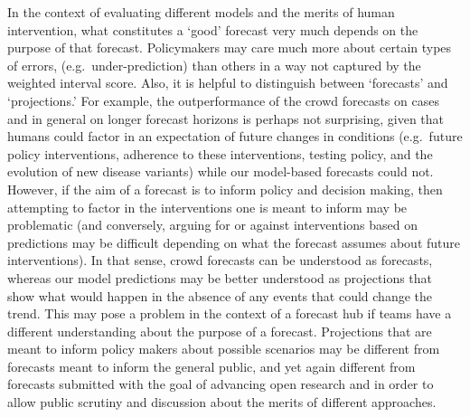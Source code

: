 \documentclass[
]{article}
\begin{document}
In the context of evaluating different models and the merits of human intervention, what constitutes a `good' forecast very much depends on the purpose of that forecast. Policymakers may care much more about certain types of errors, (e.g.~under-prediction) than others in a way not captured by the weighted interval score. Also, it is helpful to distinguish between `forecasts' and `projections.' For example, the outperformance of the crowd forecasts on cases and in general on longer forecast horizons is perhaps not surprising, given that humans could factor in an expectation of future changes in conditions (e.g.~future policy interventions, adherence to these interventions, testing policy, and the evolution of new disease variants) while our model-based forecasts could not. However, if the aim of a forecast is to inform policy and decision making, then attempting to factor in the interventions one is meant to inform may be problematic (and conversely, arguing for or against interventions based on predictions may be difficult depending on what the forecast assumes about future interventions). In that sense, crowd forecasts can be understood as forecasts, whereas our model predictions may be better understood as projections that show what would happen in the absence of any events that could change the trend. This may pose a problem in the context of a forecast hub if teams have a different understanding about the purpose of a forecast. Projections that are meant to inform policy makers about possible scenarios may be different from forecasts meant to inform the general public, and yet again different from forecasts submitted with the goal of advancing open research and in order to allow public scrutiny and discussion about the merits of different approaches.
\end{document}
